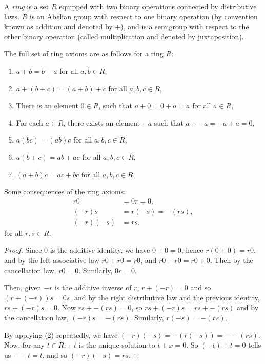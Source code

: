   \begin{Def}
    A \emph{ring} is a set $R$ equipped with two binary operations connected by
    distributive laws. $R$ is an Abelian group with respect to one binary
    operation (by convention known as addition and denoted by $+$), and is a
    semigroup with respect to the other binary operation (called multiplication
    and denoted by juxtaposition).

    The full set of ring axioms are as follows for a ring $R$:
    \begin{enumerate}
        \item
          $ a + b = b + a $ for all $ a, b \in R$,
        \item
          $ a + (b + c) = (a + b) + c $ for all $ a, b, c \in R$,
        \item
          There is an element $0 \in R$, such that
          $a + 0 = 0 + a = a$ for all $a \in R$,
        \item
          For each $a \in R$, there exists an element $-a$ such that
          $a + -a = -a + a = 0$,

        \item
          $ a(bc) = (ab)c $ for all $ a, b, c \in R$,

        \item
          $ a(b+c) = ab + ac $ for all $ a, b, c \in R$,
        \item
          $ (a+b)c = ac + bc $ for all $ a, b, c \in R$,

    \end{enumerate}
  \end{Def}

  \begin{Lemma}
    Some consequences of the ring axioms:
    \begin{align}
      r0 &= 0r = 0,\\
      (-r)s &= r(-s) = -(rs),\\
      (-r)(-s) &= rs.
    \end{align}
    for all $r, s \in R$.
  \end{Lemma}

  \begin{proof}
    Since $0$ is the additive identity, we have $0 + 0 = 0$,
    hence $r(0+0) = r0$, and by the left associative law
    $ r0 + r0 = r0 $, and $r0 + r0 = r0 + 0$. Then by the
    cancellation law, $r0 = 0$. Similarly, $0r = 0$.

    Then, given $-r$ is the additive inverse of $r$, $r + (-r) = 0$ and so
    $(r + (-r))s = 0s$, and by the right distributive law and the previous
    identity, $rs + (-r)s = 0$. Now $rs + -(rs) = 0$, so
    $rs + (-r)s = rs + -(rs)$ and by the cancellation law, $(-r)s = -(rs)$.
    Similarly, $r(-s) = -(rs)$.

    By applying (2) repeatedly, we have $(-r)(-s) = -(r(-s)) = --(rs)$.
    Now, for any $t \in R$, $-t$ is the unique solution to $t + x = 0$.
    So $(-t) + t = 0$ tells us $--t = t$, and so $(-r)(-s) = rs$.
  \end{proof}

